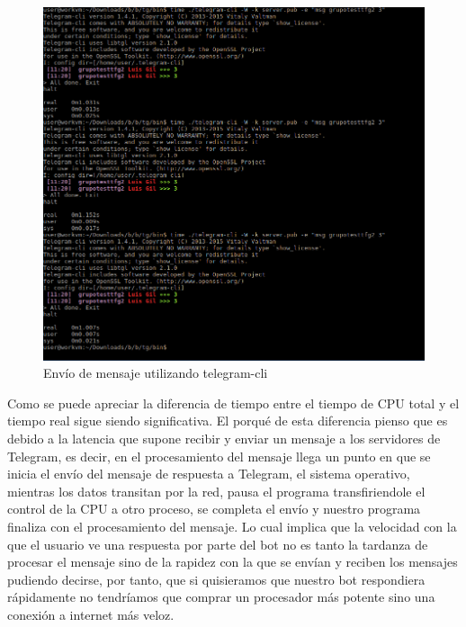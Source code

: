 \begin{figure}[H] %
\centering
\includegraphics[scale=0.4]{imagenes/random/Screenshot_2017-09-01_11-21-38}  %
\caption{Envío de mensaje utilizando telegram-cli}\label{figura94}
\end{figure}

Como se puede apreciar la diferencia de tiempo entre el tiempo de CPU total y el tiempo real sigue siendo significativa. El porqué de esta diferencia pienso que es debido a la latencia que supone recibir y enviar un mensaje a los servidores de Telegram, es decir, en el procesamiento del mensaje llega un punto en que se inicia el envío del mensaje de respuesta a Telegram, el sistema operativo, mientras los datos transitan por la red, pausa el programa transfiriendole el control de la CPU a otro proceso, se completa el envío y nuestro programa finaliza con el procesamiento del mensaje.
Lo cual implica que la velocidad con la que el usuario ve una respuesta por parte del bot no es tanto la tardanza de procesar el mensaje sino de la rapidez con la que se envían y reciben los mensajes pudiendo decirse, por tanto, que si quisieramos que nuestro bot respondiera rápidamente no tendríamos que comprar un procesador más potente sino una conexión a internet más veloz.

